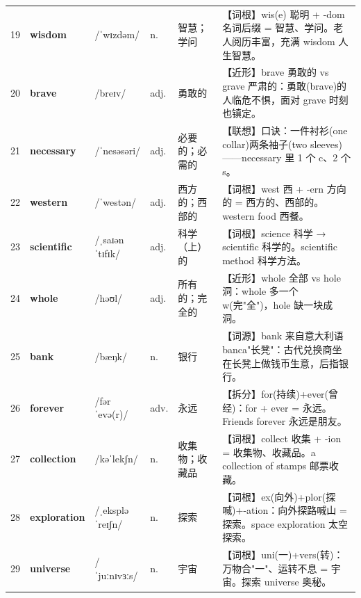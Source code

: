 \documentclass[UTF8,a4paper,11pt,oneside]{ctexbook}
\newcommand{\cellword}[1]{{\bfseries\textcolor{wordcol}{#1}}}
\newcommand{\cellipa}[1]{{\footnotesize\textcolor{ipacol}{#1}}}
\newcommand{\cellpos}[1]{\textcolor{poscol}{#1}}
\newcommand{\cellno}[1]{\textcolor{volcolor!75!black}{#1}}
\begin{document}
{\begin{longtable}{@{}C{0.045\textwidth}L{0.155\textwidth}L{0.175\textwidth}C{0.070\textwidth}L{0.180\textwidth}L{0.282\textwidth}@{}}
 \cellno{19} & \cellword{wisdom} & \cellipa{/ˈwɪzdəm/} & \cellpos{n.} & 智慧；学问 & \textcolor{tagRoot}{【词根】}wis(e) 聪明 + -dom 名词后缀 = 智慧、学问。老人阅历丰富，充满 wisdom 人生智慧。 \\
\cellno{20} & \cellword{brave} & \cellipa{/breɪv/} & \cellpos{adj.} & 勇敢的 & \textcolor{tagNear}{【近形】}brave 勇敢的 vs grave 严肃的：勇敢(brave)的人临危不惧，面对 grave 时刻也镇定。 \\
 \cellno{21} & \cellword{necessary} & \cellipa{/ˈnesəsəri/} & \cellpos{adj.} & 必要的；必需的 & \textcolor{tagAssoc}{【联想】}口诀：一件衬衫(one collar)两条袖子(two sleeves)——necessary 里 1 个 c、2 个 s。 \\
\cellno{22} & \cellword{western} & \cellipa{/ˈwestən/} & \cellpos{adj.} & 西方的；西部的 & \textcolor{tagRoot}{【词根】}west 西 + -ern 方向的 = 西方的、西部的。western food 西餐。 \\
 \cellno{23} & \cellword{scientific} & \cellipa{/ˌsaɪənˈtɪfɪk/} & \cellpos{adj.} & 科学（上）的 & \textcolor{tagRoot}{【词根】}science 科学 →\allowbreak{} scientific 科学的。scientific method 科学方法。 \\
\cellno{24} & \cellword{whole} & \cellipa{/həʊl/} & \cellpos{adj.} & 所有的；完全的 & \textcolor{tagNear}{【近形】}whole 全部 vs hole 洞：whole 多一个 w(完"全")，hole 缺一块成洞。 \\
 \cellno{25} & \cellword{bank} & \cellipa{/bæŋk/} & \cellpos{n.} & 银行 & \textcolor{tagEtym}{【词源】}bank 来自意大利语 banca"长凳"：古代兑换商坐在长凳上做钱币生意，后指银行。 \\
\cellno{26} & \cellword{forever} & \cellipa{/fərˈevə(r)/} & \cellpos{adv.} & 永远 & \textcolor{tagSplit}{【拆分】}for(持续)+ever(曾经)：for + ever = 永远。Friends forever 永远是朋友。 \\
 \cellno{27} & \cellword{collection} & \cellipa{/kəˈlekʃn/} & \cellpos{n.} & 收集物；收藏品 & \textcolor{tagRoot}{【词根】}collect 收集 + -ion = 收集物、收藏品。a collection of stamps 邮票收藏。 \\
\cellno{28} & \cellword{exploration} & \cellipa{/ˌekspləˈreɪʃn/} & \cellpos{n.} & 探索 & \textcolor{tagRoot}{【词根】}ex(向外)+plor(探喊)+-ation：向外探路喊山 = 探索。space exploration 太空探索。 \\
 \cellno{29} & \cellword{universe} & \cellipa{/ˈjuːnɪvɜːs/} & \cellpos{n.} & 宇宙 & \textcolor{tagRoot}{【词根】}uni(一)+vers(转)：万物合"一"、运转不息 = 宇宙。探索 universe 奥秘。 \\

\end{longtable}}
\end{document}
